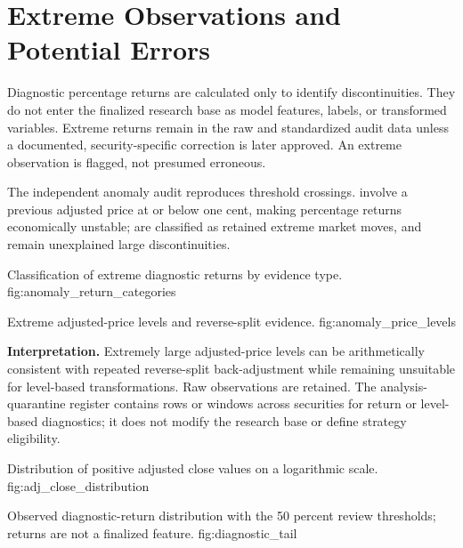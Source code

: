\section{Extreme Observations and Potential Errors}

Diagnostic percentage returns are calculated only to identify discontinuities.
They do not enter the finalized research base as model features, labels, or
transformed variables. Extreme returns remain in the raw and standardized
audit data unless a documented, security-specific correction is later approved.
An extreme observation is flagged, not presumed erroneous.


The independent anomaly audit reproduces \ExtremeReturnRows{} threshold
crossings. \NearZeroReturns{} involve a previous adjusted price at or below one
cent, making percentage returns economically unstable; \RetainedExtremes{} are
classified as retained extreme market moves, and \UnresolvedExtremes{} remain
unexplained large discontinuities.


  {Classification of extreme diagnostic returns by evidence type.}
  {fig:anomaly_return_categories}

  {Extreme adjusted-price levels and reverse-split evidence.}
  {fig:anomaly_price_levels}

\textbf{Interpretation.} Extremely large adjusted-price levels can be
arithmetically consistent with repeated reverse-split back-adjustment while
remaining unsuitable for level-based transformations. Raw observations are
retained. The analysis-quarantine register contains \QuarantineRows{} rows or
windows across \QuarantineSecurities{} securities for return or level-based
diagnostics; it does not modify the research base or define strategy
eligibility.

  {Distribution of positive adjusted close values on a logarithmic scale.}
  {fig:adj_close_distribution}

  {Observed diagnostic-return distribution with the 50 percent review thresholds; returns are not a finalized feature.}
  {fig:diagnostic_tail}

